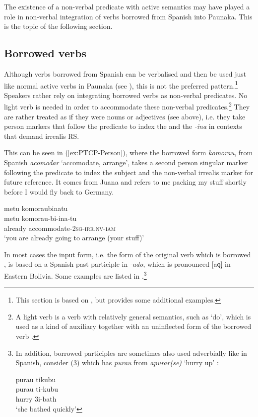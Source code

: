 The existence of a non-verbal predicate with active semantics may have played a role in non-verbal integration of verbs borrowed from Spanish into Paunaka. This is the topic of the following section.


\subsection{Borrowed verbs}\label{sec:borrowed_verbs}
Although verbs borrowed from Spanish can be verbalised and then be used just like normal active verbs in Paunaka (see ), this is not the preferred pattern.\footnote{This section is based on \citet[]{Terhart_subm}, but provides some additional examples.} Speakers rather rely on integrating borrowed verbs as non-verbal predicates. No light verb is needed in order to accommodate these non-verbal predicates.\footnote{A light verb is a verb with relatively general semantics, such as ‘do’, which is used as a kind of auxiliary together with an uninflected form of the borrowed verb \citep[102]{Wohlgemuth2009}.} They are rather treated as if they were nouns or adjectives (see  above), i.e. they take person markers that follow the predicate to index the  and the  \textit{-ina} in contexts that demand irrealis RS.

This can be seen in (\ref{ex:PTCP-Person}), where the borrowed form \textit{komorau}, from Spanish \textit{acomodar} ‘accomodate, arrange’, takes a second person singular marker following the predicate to index the subject and the non-verbal irrealis marker for future reference. It comes from Juana and refers to me packing my stuff shortly before I would fly back to Germany.

\ea\label{ex:PTCP-Person}
\begingl 
\glpreamble metu komoraubinatu\\
\gla metu komorau-bi-ina-tu\\ 
\glb already accommodate-2\textsc{sg}-\textsc{irr.nv}-\textsc{iam}\\ 
\glft ‘you are already going to arrange (your stuff)’
\trailingcitation{[jxx-p120515l-2.275]}
\xe
{}

In most cases the input form, i.e. the form of the original verb which is borrowed \citep[cf.][]{Wohlgemuth2009}, is based on a Spanish past participle in \textit{-ado}, which is pronounced [ao̪] in Eastern Bolivia. Some examples are listed in .\footnote{In addition, borrowed participles are sometimes also used adverbially like in Spanish, consider (\ref{ex:Borri-fn}) which has \textit{purau} from \textit{apurar(se)} ‘hurry up’ : 

\ea\label{ex:Borri-fn}
\begingl
\glpreamble purau tikubu\\
\gla purau ti-kubu\\
\glb hurry 3i-bath\\
\glft ‘she bathed quickly’
\endgl
\trailingcitation{[jxx-p120515l-2.152]}
\xe}

